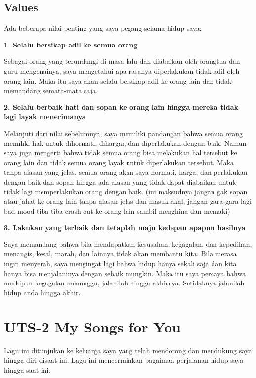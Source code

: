 \documentclass[
  letterpaper,
  DIV=11,
  numbers=noendperiod]{scrreprt}
\begin{document}
\section{\texorpdfstring{\textbf{Values}}{Values}}\label{values}

Ada beberapa nilai penting yang saya pegang selama hidup saya:

\textbf{1. Selalu bersikap adil ke semua orang}

Sebagai orang yang terundungi di masa lalu dan diabaikan oleh orangtua
dan guru mengenainya, saya mengetahui apa rasanya diperlakukan tidak
adil oleh orang lain. Maka itu saya akan selalu bersikap adil ke orang
lain dan tidak memandang semata-mata saja.

\textbf{2. Selalu berbaik hati dan sopan ke orang lain hingga mereka
tidak lagi layak menerimanya}

Melanjuti dari nilai sebelumnya, saya memiliki pandangan bahwa semua
orang memiliki hak untuk dihormati, dihargai, dan diperlakukan dengan
baik. Namun saya juga mengerti bahwa tidak semua orang bisa melakukan
hal tersebut ke orang lain dan tidak semua orang layak untuk
diperlakukan tersebut. Maka tanpa alasan yang jelas, semua orang akan
saya hormati, harga, dan perlakukan dengan baik dan sopan hingga ada
alasan yang tidak dapat diabaikan untuk tidak lagi memperlakukan orang
dengan baik. (ini maksudnya jangan gak sopan atau jahat ke orang lain
tanpa alasan jelas dan masuk akal, jangan gara-gara lagi bad mood
tiba-tiba crash out ke orang lain sambil menghina dan memaki)

\textbf{3. Lakukan yang terbaik dan tetaplah maju kedepan apapun
hasilnya}

Saya memandang bahwa bila mendapatkan kesusahan, kegagalan, dan
kepedihan, menangis, kesal, marah, dan lainnya tidak akan membantu kita.
Bila merasa ingin menyerah, saya mengingat lagi bahwa hidup hanya sekali
saja dan kita hanya bisa menjalaninya dengan sebaik mungkin. Maka itu
saya percaya bahwa meskipun kegagalan menunggu, jalanilah hingga
akhirnya. Setidaknya jalanilah hidup anda hingga akhir.


\chapter{UTS-2 My Songs for You}\label{uts-2-my-songs-for-you}

Lagu ini ditunjukan ke keluarga saya yang telah mendorong dan mendukung
saya hingga diri disaat ini. Lagu ini mencerminkan bagaiman perjalanan
hidup saya hingga saat ini.
\end{document}
